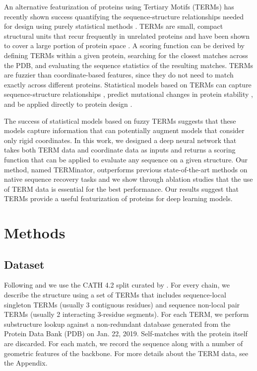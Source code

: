 \documentclass{article}
\begin{document}
An alternative featurization of proteins using Tertiary Motifs (TERMs) has recently shown success quantifying the sequence-structure relationships needed for design using purely statistical methods \citep{Zhou2020}. TERMs are small, compact structural units that recur frequently in unrelated proteins and have been shown to cover a large portion of protein space \citep{Mackenzie2016}. A scoring function can be derived by defining TERMs within a given protein, searching for the closest matches across the PDB, and evaluating the sequence statistics of the resulting matches. TERMs are fuzzier than coordinate-based features, since they do not need to match exactly across different proteins.  Statistical models based on TERMs can capture sequence-structure relationships \citep{Zheng2015}, predict mutational changes in protein stability \citep{Zheng2017}, and be applied directly to protein design \citep{Zhou2020, Frappier2019}. 

The success of statistical models based on fuzzy TERMs suggests that these models capture information that can potentially augment models that consider only rigid coordinates. In this work, we designed a deep neural network that takes both TERM data and coordinate data as inputs and returns a scoring function that can be applied to evaluate any sequence on a given structure. Our method, named TERMinator, outperforms previous state-of-the-art methods on native sequence recovery tasks and we show through ablation studies that the use of TERM data is essential for the best performance. Our results suggest that TERMs provide a useful featurization of proteins for deep learning models.

\section{Methods}
    \subsection{Dataset}
        Following \citet{Ingraham2019} and \citet{Jing2021} we use the CATH 4.2 split curated by \citet{Ingraham2019}. For every chain, we describe the structure using a set of TERMs that includes sequence-local singleton TERMs (usually 3 contiguous residues) and sequence non-local pair TERMs (usually 2 interacting 3-residue segments). For each TERM, we perform substructure lookup \citep{Zhou2020} against a non-redundant database generated from the Protein Data Bank (PDB) on Jan. 22, 2019. Self-matches with the protein itself are discarded. For each match, we record the sequence along with a number of geometric features of the backbone. For more details about the TERM data, see the Appendix.
        
\end{document}
